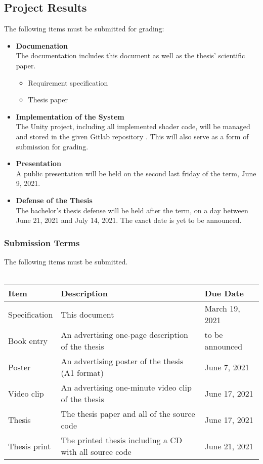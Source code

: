\subsection{Project Results}
The following items must be submitted for grading:
\begin{itemize}
    \item \textbf{Documenation} \\
    The documentation includes this document as well as the thesis' scientific paper.
    \begin{itemize}
        \item Requirement specification
        \item Thesis paper
    \end{itemize}
    \item \textbf{Implementation of the System} \\
    The Unity project, including all implemented shader code, will be managed and stored in the given Gitlab repository \cite{gitlab}. This will also serve as a form of submission for grading.
    \item \textbf{Presentation} \\
    A public presentation will be held on the second last friday of the term, June 9, 2021.
    \item \textbf{Defense of the Thesis} \\
    The bachelor's thesis defense will be held after the term, on a day between June 21, 2021 and July 14, 2021. The exact date is yet to be announced. 
\end{itemize}

\subsubsection{Submission Terms}
The following items must be submitted.
\\\\
\noindent
\begin{tabular}{|l|l|l|}
    \hline
    \textbf{Item}    & \textbf{Description}                                      & \textbf{Due Date}     \\ \hline
    Specification    & This document                                             & March 19, 2021      \\ \hline
    Book entry       & An advertising one-page description of the thesis         & to be announced       \\ \hline
    Poster           & An advertising poster of the thesis (A1 format)           & June 7, 2021        \\ \hline
    Video clip       & An advertising one-minute video clip of the thesis        & June 17, 2021       \\ \hline
    Thesis           & The thesis paper and all of the source code               & June 17, 2021       \\ \hline
    Thesis print     & The printed thesis including a CD with all source code    & June 21, 2021       \\ \hline
\end{tabular}
\newline
\noindent